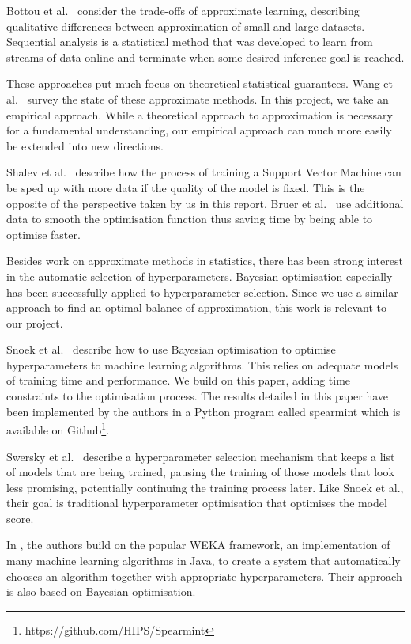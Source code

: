 \documentclass[a4paper,12pt,twoside,openright]{report}
\begin{document}
Bottou et al.\ \cite{Bottou08thetradeoffs} consider the trade-offs of approximate learning, describing qualitative differences between approximation of small and large datasets. Sequential analysis \cite{wald1945, 10.1057/9780230226203.1513} is a statistical method that was developed to learn from streams of data online and terminate when some desired inference goal is reached.

These approaches put much focus on theoretical statistical guarantees.  Wang et al.\ \cite{2015arXiv150207989W} survey the state of these approximate methods. In this project, we take an empirical approach. While a theoretical approach to approximation is necessary for a fundamental understanding, our empirical approach can much more easily be extended into new directions.

Shalev et al.\ \cite{Shalev-Shwartz:2008:SOI:1390156.1390273} describe how the process of training a Support Vector Machine can be sped up with more data if the quality of the model is fixed. This is the opposite of the perspective taken by us in this report. Bruer et al.\ \cite{NIPS2014_5259} use additional data to smooth the optimisation function thus saving time by being able to optimise faster.

Besides work on approximate methods in statistics, there has been strong interest in the automatic selection of hyperparameters. Bayesian optimisation especially has been successfully applied to hyperparameter selection. Since we use a similar approach to find an optimal balance of approximation, this work is relevant to our project.

Snoek et al.\ \cite{PracticalBayesianOptimization} describe how to use Bayesian optimisation to optimise hyperparameters to machine learning algorithms. This relies on adequate models of training time and performance. We build on this paper, adding time constraints to the optimisation process. The results detailed in this paper have been implemented by the authors in a Python program called spearmint  which is available on Github\footnote{https://github.com/HIPS/Spearmint}.

Swersky et al.\ \cite{2014arXiv1406.3896S} describe a hyperparameter selection mechanism that keeps a list of models that are being trained, pausing the training of those models that look less promising, potentially continuing the training process later. Like Snoek et al., their goal is traditional hyperparameter optimisation that optimises the model score.

In \cite{ThoHutHooLey13-AutoWEKA}, the authors build on the popular WEKA framework, an implementation of many machine learning algorithms in Java, to create a system that automatically chooses an algorithm together with appropriate hyperparameters. Their approach is also based on Bayesian optimisation.
\end{document}
